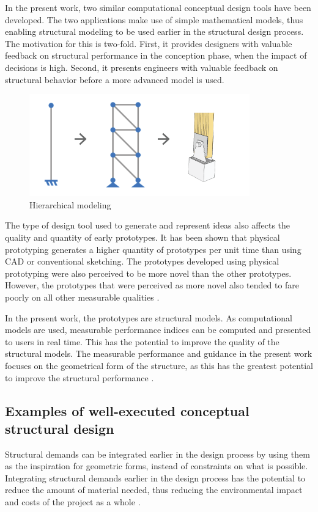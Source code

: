 In the present work, two similar computational conceptual design tools have been developed. The two applications make use of simple mathematical models, thus enabling structural modeling to be used earlier in the structural design process. The motivation for this is two-fold. First, it provides designers with valuable feedback on structural performance in the conception phase, when the impact of decisions is high. Second, it presents engineers with valuable feedback on structural behavior before a more advanced model is used. 

\begin{figure}
  \includegraphics[width=270pt]{graphics/hiarchical-modelling.png}
  \caption{Hierarchical modeling}
  \label{fig:hiarchical-modelling}
\end{figure}

The type of design tool used to generate and represent ideas also affects the quality and quantity of early prototypes. It has been shown \cite{Haggman2015} that physical prototyping generates a higher quantity of prototypes per unit time than using CAD or conventional sketching. The prototypes developed using physical prototyping were also perceived to be more novel than the other prototypes. However, the prototypes that were perceived as more novel also tended to fare poorly on all other measurable qualities \cite{Haggman2015}. 

In the present work, the prototypes are structural models. As computational models are used, measurable performance indices can be computed and presented to users in real time. This has the potential to improve the quality of the structural models. The measurable performance and guidance in the present work focuses on the geometrical form of the structure, as this has the greatest potential to improve the structural performance \cite{Mueller2014}. 

\subsection{Examples of well-executed conceptual structural design}
Structural demands can be integrated earlier in the design process by using them as the inspiration for geometric forms, instead of constraints on what is possible. Integrating structural demands earlier in the design process has the potential to reduce the amount of material needed, thus reducing the environmental impact and costs of the project as a whole \cite{Mueller2014}. 

